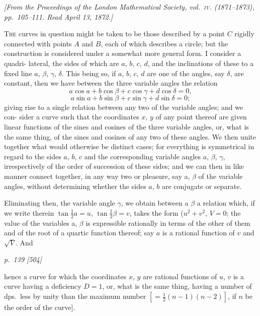 \documentclass[11pt,a4paper]{book}
\begin{document}
\begin{center}
\textit{[From the Proceedings of the London Mathematical Society, vol.~\textsc{iv}. (1871--1873), pp.~105--111.  Read April 13, 1872.]}
\end{center}

\textsc{The} curves in question might be taken to be those described by a point $C$
rigidly connected with points $A$ and $B$, each of which describes a circle; but the
construction is considered under a somewhat more general form. I consider a quadri-
lateral, the sides of which are $a$, $b$, $c$, $d$, and the inclinations of these to a fixed line
$a$, $\beta$, $\gamma$, $\delta$. This being so, if $a$, $b$, $c$, $d$ are one of the angles, say $\delta$, are constant, then
we have between the three variable angles the relation
\[
a\cos a + b\cos\beta + c\cos\gamma + d\cos\delta = 0,
\]
\[
a\sin a + b\sin\beta + c\sin\gamma + d\sin\delta = 0;
\]
giving rise to a single relation between any two of the variable angles; and we con-
sider a curve such that the coordinates $x$, $y$ of any point thereof are given linear
functions of the sines and cosines of the three variable angles, or, what is the same
thing, of the sines and cosines of any two of these angles. We then unite together
what would otherwise be distinct cases; for everything is symmetrical in regard to the
sides $a$, $b$, $c$ and the corresponding variable angles $a$, $\beta$, $\gamma$, irrespectively of the order
of succession of these sides; and we can then in like manner connect together, in any
way two or pleasure, say a, $\beta$ of the variable angles, without determining whether the
sides $a$, $b$ are conjugate or separate.

Eliminating then, the variable angle $\gamma$, we obtain between a $\beta$ a relation which,
if we write therein $\tan\frac{1}{2}a = u$, $\tan\frac{1}{2}\beta = v$, takes the form ($u^2 + v^2$, $V = 0$; the value
of the variables a, $\beta$ is expressible rationally in terms of the other of them and of the
root of a quartic function thereof; say $a$ is a rational function of $v$ and $\sqrt{V}$. And

\clearpage

\bigskip
\textit{p.~139 [504]}
\smallskip

\noindent
hence a curve for which the coordinates $x$, $y$ are rational functions of $u$, $v$ is a curve
having a deficiency $D = 1$, or, what is the same thing, having a number of dps.\ less
by unity than the maximum number $[= \tfrac{1}{2} (n - 1)(n - 2)]$, if $n$ be the order of the curve].
\end{document}
